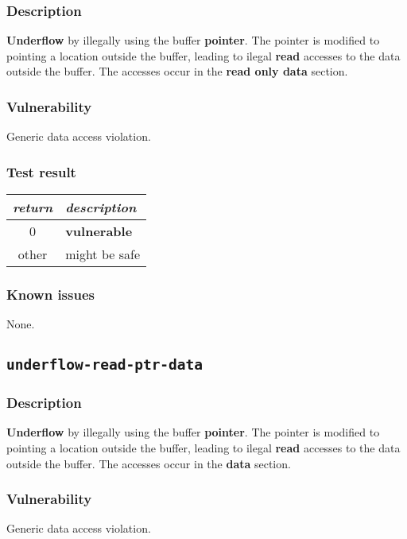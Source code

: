 \documentclass[a4paper]{book}
\begin{document}
\subsubsection{Description}

\textbf{Underflow} by illegally using the buffer \textbf{pointer}.
The pointer is modified to pointing a location outside the buffer,
leading to ilegal \textbf{read} accesses to the data outside the buffer.
The accesses occur in the \textbf{read only data} section.

\subsubsection{Vulnerability}
Generic data access violation.

\subsubsection{Test result}

\begin{tabular}{cl}
  \toprule
  \emph{return}  & \emph{description} \\
  \midrule
  0              & \textbf{vulnerable} \\
  other          & might be safe \\
  \bottomrule
\end{tabular}

\subsubsection{Known issues}

None.

\newpage

\subsection{\texttt{underflow-read-ptr-data}}\label{test-underflow-read-ptr-data}

\subsubsection{Description}

\textbf{Underflow} by illegally using the buffer \textbf{pointer}.
The pointer is modified to pointing a location outside the buffer,
leading to ilegal \textbf{read} accesses to the data outside the buffer.
The accesses occur in the \textbf{data} section.

\subsubsection{Vulnerability}
Generic data access violation.
\end{document}
